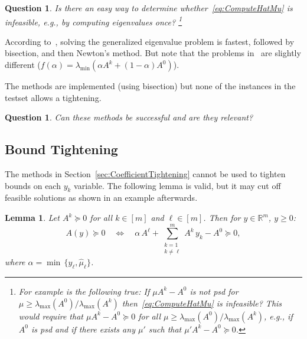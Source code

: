 \documentclass[10pt, a4paper]{article}
\newcommand{\R}{\mathds{R}}
\newtheorem{lemma}[theorem]{Lemma}
\newtheorem{question}[theorem]{Question}
\begin{document}
\begin{question}
  Is there an easy way to determine whether~\eqref{eq:ComputeHatMu} is
  infeasible, e.g., by computing eigenvalues once?  \footnote{For example
    is the following true: If $\mu A^k - A^0$ is not psd for
    $\mu \geq \lambda_{\max}(A^0)/\lambda_{\max}(A^k)$ then~\eqref{eq:ComputeHatMu} is
    infeasible? This would require that $\mu A^k - A^0 \succeq 0$ for all
    $\mu \geq \lambda_{\max}(A^0) / \lambda_{\max}(A^k)$, e.g., if $A^0$ is
    psd and if there exists any $\mu'$ such that $\mu' A^k - A^0 \succeq 0$.}
\end{question}

According to~\cite{Str16,HigSS16}, solving the generalized eigenvalue
problem is fastest, followed by bisection, and then Newton's method. But
note that the problems in~\cite{Str16,HigSS16} are slightly different
($f(\alpha) = \lambda_{\min}(\alpha A^k + (1 - \alpha) A^0)$).

The methods are implemented (using bisection) but none of the instances in
the testset allows a tightening.

\begin{question}
  Can these methods be successful and are they relevant?
\end{question}



\subsection{Bound Tightening}

The methods in Section~\ref{sec:CoefficientTightening} cannot be used to
tighten bounds on each $y_k$ variable. The following lemma is valid, but it
may cut off feasible solutions as shown in an example afterwards.

\begin{lemma}
  Let $A^k \succeq 0$ for all $k \in [m]$ and $\ell \in [m]$. Then for
  $y \in \R^m$, $y \geq 0$:
  \[
    A(y) \succeq 0 \quad\Leftrightarrow\quad
    \alpha\, A^{\ell} + \sum_{\substack{k=1\\k \neq \ell}}^m A^k\, y_k - A^0 \succeq 0,
  \]
  where $\alpha = \min\,\{y_{\ell},\hat{\mu}_{\ell}\}$.
\end{lemma}
\end{document}
